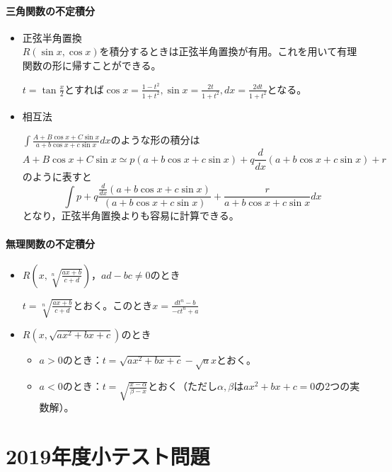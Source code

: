 \documentclass[dvipdfmx,a4j,10pt]{jsarticle}
\theoremstyle{mystyle1}
\theoremstyle{mystyle2}
\begin{document}
\subsection{三角関数の不定積分}
\begin{itemize}
\item 正弦半角置換\\
$R(\sin x,\cos x)$を積分するときは正弦半角置換が有用。これを用いて有理関数の形に帰すことができる。
\begin{framed}
$\displaystyle t=\tan\frac{x}{2}$とすれば$\displaystyle \cos x=\frac{1-t^2}{1+t^2},\sin x=\frac{2t}{1+t^2}, dx=\frac{2dt}{1+t^2}$となる。
\end{framed}

\item 相互法\\
\begin{framed}
$\displaystyle\int\frac{A+B\cos x+C\sin x}{a+b\cos x+c\sin x} dx$のような形の積分は
\[
A+B\cos x+C\sin x\simeq p(a+b\cos x+c\sin x)+q\frac{d}{dx}(a+b\cos x+c\sin x)+r
\]
のように表すと
\[
\int p+q\frac{\frac{d}{dx}(a+b\cos x+c\sin x)}{(a+b\cos x+c\sin x)}+\frac{r}{a+b\cos x+c\sin x}dx
\]
となり，正弦半角置換よりも容易に計算できる。
\end{framed}
\end{itemize}

\subsection{無理関数の不定積分}
\begin{itemize}
\item $R\left(x,\sqrt[n]{\frac{ax+b}{c+d}}\right)$，$ad-bc\neq0$のとき
\begin{framed}
$\displaystyle t=\sqrt[n]{\frac{ax+b}{c+d}}$とおく。このとき$\displaystyle x=\frac{dt^n-b}{-ct^n+a}$
\end{framed}
\item
$R(x,\sqrt{ax^2+bx+c})$のとき
\begin{itemize}
\item $a>0$のとき：$t=\sqrt{ax^2+bx+c}-\sqrt{a}x$とおく。
\item $a<0$のとき：$\displaystyle t=\sqrt{\frac{x-\alpha}{\beta-x}}$とおく（ただし$\alpha,\beta$は$ax^2+bx+c=0$の2つの実数解）。
\end{itemize}

\end{itemize}
\newpage

\part{2019年度小テスト問題}
\end{document}
